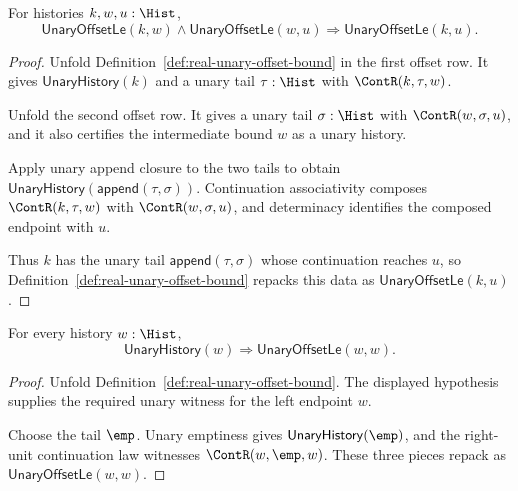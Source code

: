 \begin{lemma}
\label{lem:real-unary-offset-bound-transitivity}
For histories $k,w,u:\Hist$,
$$
\mathsf{UnaryOffsetLe}(k,w)\land \mathsf{UnaryOffsetLe}(w,u)
\Longrightarrow
\mathsf{UnaryOffsetLe}(k,u).
$$
\end{lemma}
\begin{proof}
Unfold Definition~\ref{def:real-unary-offset-bound} in the first offset row.
It gives $\mathsf{UnaryHistory}(k)$ and a unary tail $\tau:\Hist$ with
$\ContR(k,\tau,w)$.

Unfold the second offset row. It gives a unary tail $\sigma:\Hist$ with
$\ContR(w,\sigma,u)$, and it also certifies the intermediate bound $w$ as a
unary history.

Apply unary append closure to the two tails to obtain
$\mathsf{UnaryHistory}(\mathsf{append}(\tau,\sigma))$. Continuation
associativity composes $\ContR(k,\tau,w)$ with $\ContR(w,\sigma,u)$, and
determinacy identifies the composed endpoint with $u$.

Thus $k$ has the unary tail $\mathsf{append}(\tau,\sigma)$ whose continuation
reaches $u$, so Definition~\ref{def:real-unary-offset-bound} repacks this data
as $\mathsf{UnaryOffsetLe}(k,u)$.
\end{proof}

\begin{lemma}
\label{lem:real-unary-offset-bound-reflexivity}
For every history $w:\Hist$,
$$
\mathsf{UnaryHistory}(w)\Longrightarrow\mathsf{UnaryOffsetLe}(w,w).
$$
\end{lemma}
\begin{proof}
Unfold Definition~\ref{def:real-unary-offset-bound}. The displayed hypothesis
supplies the required unary witness for the left endpoint $w$.

Choose the tail $\emp$. Unary emptiness gives $\mathsf{UnaryHistory}(\emp)$,
and the right-unit continuation law witnesses $\ContR(w,\emp,w)$. These three
pieces repack as $\mathsf{UnaryOffsetLe}(w,w)$.
\end{proof}

